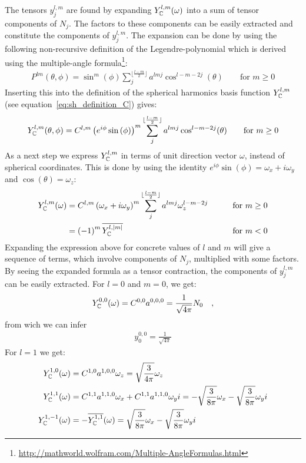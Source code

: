 The tensors $y^{l,m}_j$ are found by expanding $Y_{\mathbb{C}}^{l,m}(\omega)$ into a sum of tensor components of $N_j$. The factors to these components can be easily extracted and constitute the components of $y^{l,m}_j$. The expansion can be done by using the following non-recursive definition of the Legendre-polynomial which is derived using the multiple-angle formula\footnote{\url{http://mathworld.wolfram.com/Multiple-AngleFormulas.html}}:
\begin{align}
P^{lm}(\theta, \phi) = \operatorname{sin}^m(\phi)\sum_j^{\lfloor\frac{l-m}{2}\rfloor}a^{lmj}\operatorname{cos}^{l-m-2j}(\theta)
\qquad \text{for } m \ge 0
\end{align}
Inserting this into the definition of the spherical harmonics basis function $Y_{\mathbb{C}}^{l,m}$ (see equation~\ref{eq:sh_definition_C}) gives:
\begin{align}
Y_{\mathbb{C}}^{l,m}(\theta, \phi) = C^{l,m}\left(e^{i\phi}\operatorname{sin}\left(\phi\right)\right)^m \sum_j^{\lfloor\frac{l-m}{2}\rfloor}a^{lmj}\operatorname{cos}^{l-m-2j}(\theta)
\qquad \text{for } m \ge 0
\end{align}
As a next step we express $Y_{\mathbb{C}}^{l,m}$ in terms of unit direction vector $\omega$, instead of spherical coordinates. This is done by using the identity $e^{i\phi}\operatorname{sin}\left(\phi\right) = \omega_x + i\omega_y$ and $\operatorname{cos}(\theta) = \omega_z$:
\begin{align}
Y_{\mathbb{C}}^{l,m}(\omega) &=  C^{l,m}\left( \omega_x + i\omega_y\right)^m \sum_j^{\lfloor\frac{l-m}{2}\rfloor}a^{lmj}\omega_z^{l-m-2j}
&\qquad \text{for } m \ge 0
\\
&= \left(-1\right)^m\overline{Y_{\mathbb{C}}^{l,\left\vert m\right\vert}}
&\qquad \text{for } m < 0
\end{align}
Expanding the expression above for concrete values of $l$ and $m$ will give a sequence of terms, which involve components of $N_j$, multiplied with some factors. By seeing the expanded formula as a tensor contraction, the components of $y^{l,m}_j$ can be easily extracted. For $l=0$ and $m=0$, we get:
\begin{align}
Y_{\mathbb{C}}^{0,0}(\omega) = C^{{0,0}}a^{{0,0,0}} = \frac{1}{\sqrt{4\pi}}N_0\quad,
\end{align}
from wich we can infer
\begin{align}
y^{0,0}_0 = \frac{1}{\sqrt{4\pi}}
\end{align}
For $l=1$ we get:
\begin{align}
Y_{\mathbb{C}}^{1,0}(\omega) &= C^{{1,0}}a^{{1,0,0}}\omega_z = \sqrt{\frac{3}{4\pi}}\omega_z
\\
Y_{\mathbb{C}}^{1,1}(\omega) &= C^{{1,1}}a^{{1,1,0}}\omega_x+C^{{1,1}}a^{{1,1,0}}\omega_yi = -\sqrt{\frac{3}{8\pi}}\omega_x - \sqrt{\frac{3}{8\pi}}\omega_yi
\\
Y_{\mathbb{C}}^{1,-1}(\omega) &= -\overline{Y_{\mathbb{C}}^{1,1}}(\omega)
= \sqrt{\frac{3}{8\pi}}\omega_x - \sqrt{\frac{3}{8\pi}}\omega_yi
\end{align}
